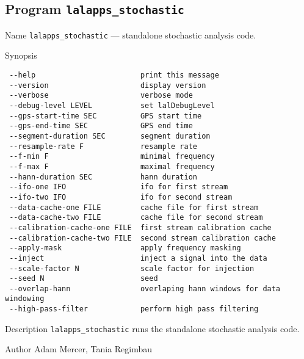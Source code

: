 \clearpage
\subsection{Program \texttt{lalapps\_stochastic}}
\label{program:lalapps-stochastic}

\begin{entry}
\item[Name]
\verb$lalapps_stochastic$ --- standalone stochastic analysis code.

\item[Synopsis]
\begin{verbatim}
 --help                        print this message
 --version                     display version
 --verbose                     verbose mode
 --debug-level LEVEL           set lalDebugLevel
 --gps-start-time SEC          GPS start time
 --gps-end-time SEC            GPS end time
 --segment-duration SEC        segment duration
 --resample-rate F             resample rate
 --f-min F                     minimal frequency
 --f-max F                     maximal frequency
 --hann-duration SEC           hann duration
 --ifo-one IFO                 ifo for first stream
 --ifo-two IFO                 ifo for second stream
 --data-cache-one FILE         cache file for first stream
 --data-cache-two FILE         cache file for second stream
 --calibration-cache-one FILE  first stream calibration cache
 --calibration-cache-two FILE  second stream calibration cache
 --apply-mask                  apply frequency masking
 --inject                      inject a signal into the data
 --scale-factor N              scale factor for injection
 --seed N                      seed
 --overlap-hann                overlaping hann windows for data windowing
 --high-pass-filter            perform high pass filtering
\end{verbatim}

\item[Description] \verb$lalapps_stochastic$ runs the standalone
stochastic analysis code.

\item[Author] 
Adam Mercer, Tania Regimbau
\end{entry}
